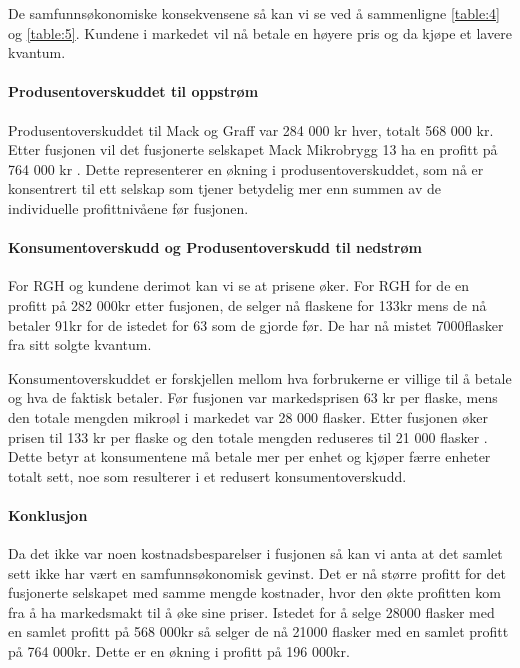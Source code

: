 \documentclass[
  12pt,
  a4paper,
  DIV=11,
  numbers=noendperiod]{scrartcl}
\let\oldparagraph\paragraph
\renewcommand{\paragraph}[1]{\oldparagraph{#1}\mbox{}}
\begin{document}
De samfunnsøkonomiske konsekvensene så kan vi se ved å sammenligne
\autoref{table:4} og \autoref{table:5}. Kundene i markedet vil nå betale
en høyere pris og da kjøpe et lavere kvantum.

\paragraph{Produsentoverskuddet til
oppstrøm}\label{produsentoverskuddet-til-oppstruxf8m}

Produsentoverskuddet til Mack og Graff var 284 000 kr hver, totalt 568
000 kr. Etter fusjonen vil det fusjonerte selskapet Mack Mikrobrygg 13
ha en profitt på 764 000 kr . Dette representerer en økning i
produsentoverskuddet, som nå er konsentrert til ett selskap som tjener
betydelig mer enn summen av de individuelle profittnivåene før fusjonen.

\paragraph{Konsumentoverskudd og Produsentoverskudd til
nedstrøm}\label{konsumentoverskudd-og-produsentoverskudd-til-nedstruxf8m}

For RGH og kundene derimot kan vi se at prisene øker. For RGH for de en
profitt på 282 000kr etter fusjonen, de selger nå flaskene for 133kr
mens de nå betaler 91kr for de istedet for 63 som de gjorde før. De har
nå mistet 7000flasker fra sitt solgte kvantum.

Konsumentoverskuddet er forskjellen mellom hva forbrukerne er villige
til å betale og hva de faktisk betaler. Før fusjonen var markedsprisen
63 kr per flaske, mens den totale mengden mikroøl i markedet var 28 000
flasker. Etter fusjonen øker prisen til 133 kr per flaske og den totale
mengden reduseres til 21 000 flasker . Dette betyr at konsumentene må
betale mer per enhet og kjøper færre enheter totalt sett, noe som
resulterer i et redusert konsumentoverskudd.

\paragraph{Konklusjon}\label{konklusjon}

Da det ikke var noen kostnadsbesparelser i fusjonen så kan vi anta at
det samlet sett ikke har vært en samfunnsøkonomisk gevinst. Det er nå
større profitt for det fusjonerte selskapet med samme mengde kostnader,
hvor den økte profitten kom fra å ha markedsmakt til å øke sine priser.
Istedet for å selge 28000 flasker med en samlet profitt på 568 000kr så
selger de nå 21000 flasker med en samlet profitt på 764 000kr. Dette er
en økning i profitt på 196 000kr.
\end{document}
